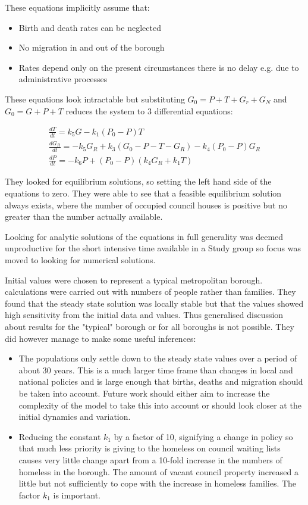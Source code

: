\documentclass[11pt]{article} %
\begin{document}
	These equations implicitly assume that:  
	\begin{itemize}
		\item Birth and death rates can be neglected
		\item No migration in and out of the borough 
		\item Rates depend only on the present circumstances there is no delay e.g. due to administrative processes 
	\end{itemize}

These equations look intractable but substituting $ G_0=P+T+G_r+G_N $ and $ G_0=G+P+T$ reduces the system to 3 differential equations:

\begin{eqnarray}
\frac{dT}{dt}=k_5 G -k_1(P_0 -P)T\\
\frac{dG_R}{dt}=-k_5 G_R+k_3(G_0-P-T-G_R)-k_4(P_0-P)G_R\\
\frac{dP}{dt}=-k_6P+(P_0-P)(k_4G_R+k_1T)
\end{eqnarray}
	
	They looked for equilibrium solutions, so setting the left hand side of the equations to zero. They were able to see that a feasible equilibrium solution always exists, where the number of occupied council houses is positive but no greater than the number actually available. 
	
	Looking for analytic solutions of the equations in full generality was deemed unproductive for the short intensive time available in a Study group so focus was moved to looking for numerical solutions. 
	
	Initial values were chosen to represent a typical metropolitan borough. calculations were carried out with numbers of people rather than families. They found that the steady state solution was locally stable but that the values showed high sensitivity from the initial data and values. Thus generalised discussion about results for the "typical" borough or for all boroughs is not possible. They did however manage to make some useful inferences: 
	

	\begin{itemize}
		\item The populations only settle down to the steady state values over a period of about 30 years. This is a much larger time frame than changes in local and national policies and is large enough that births, deaths and migration should be taken into account. Future work should either aim to increase the complexity of the model to take this into account or should look closer at the initial dynamics and variation. 
		\item Reducing the constant $ k_1 $ by a factor of 10, signifying a change in policy so that much less priority is giving to the homeless on council waiting lists causes very little change apart from a 10-fold increase in the numbers of homeless in the borough. The amount of vacant council property increased a little but not sufficiently to cope with the increase in homeless families. The factor $ k_1 $ is important. 
	\end{itemize}
	
\end{document}
